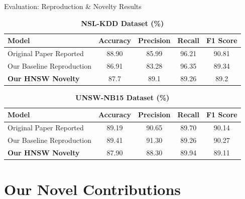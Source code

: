 \documentclass[aspectratio=169]{beamer}
\begin{document}
\begin{frame}{Evaluation: Reproduction \& Novelty Results}
    \begin{table}[h]
        \centering
        \caption{\textbf{NSL-KDD Dataset (\%)}}
        \renewcommand{\arraystretch}{1.2}
        \begin{tabular}{@{}lcccc@{}}
            \toprule
            \textbf{Model} & \textbf{Accuracy} & \textbf{Precision} & \textbf{Recall} & \textbf{F1 Score} \\
            \midrule
            Original Paper Reported & 88.90 & 85.99 & 96.21 & 90.81 \\
            Our Baseline Reproduction & 86.91 & 83.28 & 96.35 & 89.34 \\
            \textbf{Our HNSW Novelty} & 87.7 & 89.1 & 89.26 & 89.2 \\
            \bottomrule
        \end{tabular}
    \end{table}

    \vspace{0.2cm}

    \begin{table}[h]
        \centering
        \caption{\textbf{UNSW-NB15 Dataset (\%)}}
        \renewcommand{\arraystretch}{1.2}
        \begin{tabular}{@{}lcccc@{}}
            \toprule
            \textbf{Model} & \textbf{Accuracy} & \textbf{Precision} & \textbf{Recall} & \textbf{F1 Score} \\
            \midrule
            Original Paper Reported & 89.19 & 90.65 & 89.70 & 90.14 \\
            Our Baseline Reproduction & 89.41 & 91.30 & 89.26 & 90.27 \\
            \textbf{Our HNSW Novelty} & 87.90 & 88.30 & 89.94 & 89.11 \\
            \bottomrule
        \end{tabular}
    \end{table}
\end{frame}

\section{Our Novel Contributions}
\end{document}
